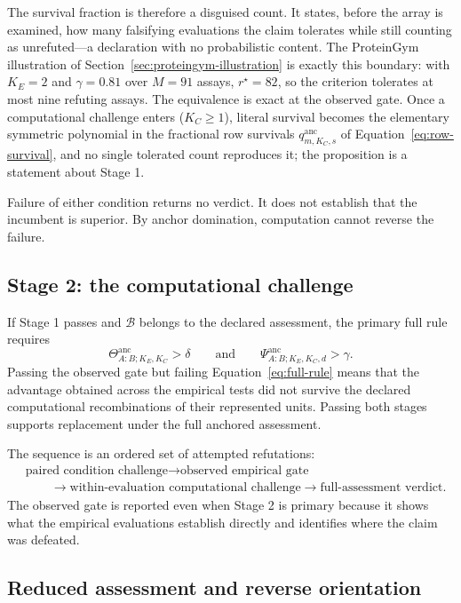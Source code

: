 \documentclass[11pt]{article}
\newcommand{\Boot}{\mathcal{B}}
\newcommand{\Psianc}{\Psi^{\mathrm{anc}}}
\newcommand{\Thetaanc}{\Theta^{\mathrm{anc}}}
\theoremstyle{remark}
\begin{document}
The survival fraction is therefore a disguised count. It states, before the
array is examined, how many falsifying evaluations the claim tolerates while
still counting as unrefuted---a declaration with no probabilistic content. The
ProteinGym illustration of Section~\ref{sec:proteingym-illustration} is exactly
this boundary: with $K_E=2$ and $\gamma=0.81$ over $M=91$ assays, $r^\star=82$,
so the criterion tolerates at most nine refuting assays. The equivalence is
exact at the observed gate. Once a computational challenge enters ($K_C\geq1$),
literal survival becomes the elementary symmetric polynomial in the fractional
row survivals $q^{\mathrm{anc}}_{m,K_C,s}$ of Equation~\eqref{eq:row-survival},
and no single tolerated count reproduces it; the proposition is a statement
about Stage 1.

Failure of either condition returns no verdict. It does not establish that the
incumbent is superior. By anchor domination, computation cannot reverse the
failure.

\subsection{Stage 2: the computational challenge}

If Stage 1 passes and $\Boot$ belongs to the declared assessment, the primary
full rule requires
\begin{equation}
\Thetaanc_{A:B;K_E,K_C}>\delta
\qquad\text{and}\qquad
\Psianc_{A:B;K_E,K_C,d}>\gamma.
\label{eq:full-rule}
\end{equation}
Passing the observed gate but failing Equation~\eqref{eq:full-rule} means that
the advantage obtained across the empirical tests did not survive the declared
computational recombinations of their represented units. Passing both stages
supports replacement under the full anchored assessment.

The sequence is an ordered set of attempted refutations:
\[
\begin{aligned}
&\text{paired condition challenge}
\longrightarrow
\text{observed empirical gate}\\
&\qquad\longrightarrow
\text{within-evaluation computational challenge}
\longrightarrow
\text{full-assessment verdict}.
\end{aligned}
\]
The observed gate is reported even when Stage 2 is primary because it shows
what the empirical evaluations establish directly and identifies where the
claim was defeated.

\subsection{Reduced assessment and reverse orientation}
\end{document}
